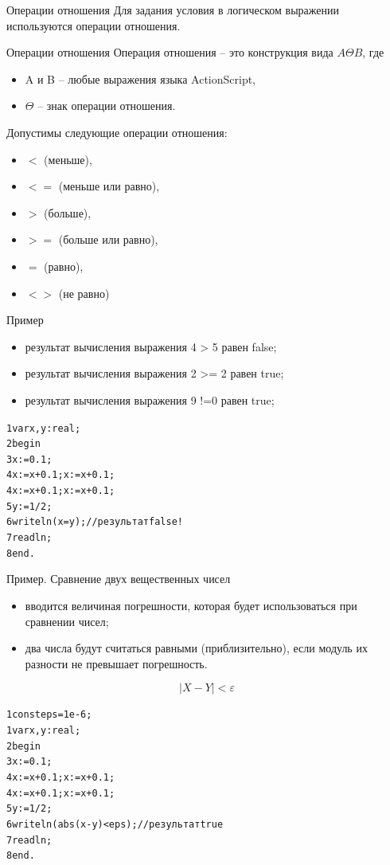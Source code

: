 \documentclass{beamer}
\begin{document}
\begin{frame}[fragile]{Операции отношения}
Для задания условия в логическом выражении используются операции отношения. 
\begin{block}{Операции отношения}
Операция отношения – это конструкция вида $A\Theta B$, где 
\begin{itemize}
\item A и B – любые выражения языка ActionScript, 
\item $\Theta$ – знак операции отношения.
\end{itemize}
Допустимы следующие операции отношения:
\begin{itemize}
\item $<$ (меньше), 
\item $<=$ (меньше или равно), 
\item $>$ (больше), 
\item $>=$ (больше или равно), 
\item $=$ (равно), 
\item $<>$ (не равно)
\end{itemize}
\end{block}
\end{frame}

\begin{frame}[fragile]{Пример}
\begin{itemize}
\item результат вычисления выражения 4 > 5 равен false;
\item результат вычисления выражения 2 >= 2 равен true;
\item результат вычисления выражения 9 !=0  равен true;
\end{itemize}
\begin{alltt}
1 var x, y: real;
2 begin
3  x := 0.1;
4  x := x + 0.1; x := x + 0.1;
4  x := x + 0.1; x := x + 0.1;
5  y := 1/2;
6  writeln(x=y); //результат false!
7  readln;
8 end.
\end{alltt}
\end{frame}

\begin{frame}[fragile]{Пример. Сравнение двух вещественных чисел}
\begin{itemize}
\item вводится величиная погрешности, которая будет использоваться при сравнении чисел;
\item два числа будут считаться равными (приблизительно), если модуль их разности не превышает погрешность.
\end{itemize}
\[|X - Y| < \varepsilon\]
\begin{alltt}
1 const eps = 1e-6;
1 var x, y: real;
2 begin
3   x := 0.1;
4   x := x + 0.1; x := x + 0.1;
4   x := x + 0.1; x := x + 0.1;
5   y := 1/2;
6   writeln(abs(x-y)<eps); //результат true
7   readln;
8 end.
\end{alltt}
\end{frame}
\end{document}
